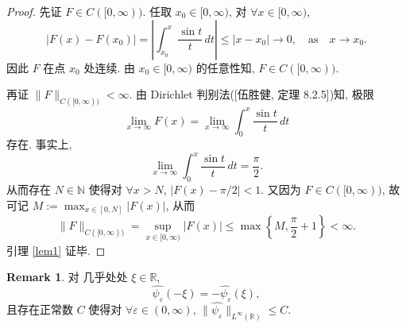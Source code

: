 \documentclass[a4paper,11pt]{article}
\theoremstyle{definition}
\newtheorem{remark}[theorem]{Remark}
\begin{document}
\begin{CJK*}{UTF8}{gbsn}
\begin{proof} 
    先证 $ F \in C([0, \infty)) $. 任取 $ x_0 \in [0, \infty) $,
    对 $ \forall x \in [0, \infty) $,
    $$
        |F(x) - F(x_0)|
            = \left| \int_{x_0}^x \frac{\sin t}{t} \, dt \right|
            \leq |x - x_0|
            \to 0, \quad \text{as} \quad x \to x_0.
    $$
    因此 $ F $ 在点 $ x_0 $ 处连续. 由 $ x_0 \in [0, \infty) $ 的任意性知, $ F \in C([0, \infty)) $.

    再证 $ \| F \|_{C([0, \infty))} < \infty $.
    由 Dirichlet 判别法([伍胜健, 定理 8.2.5])知, 极限
    $$
        \lim_{x \to \infty} F(x) 
            = \lim_{x \to \infty} \int_0^x \frac{\sin t}{t} \, dt
    $$
    存在. 事实上,
    $$
        \lim_{x \to \infty} \int_0^x \frac{\sin t}{t} \, dt = \frac{\pi}{2}.
    $$ 
    从而存在 $ N \in \mathbb{N} $ 使得对 $ \forall x > N $, $ |F(x) - \pi/2| < 1 $.
    又因为 $ F \in C([0, \infty)) $, 故可记 $ M := \max_{x \in [0, N]} |F(x)| $, 
    从而
    $$
        \| F \|_{C([0, \infty))} = \sup_{x \in [0, \infty)} |F(x)| 
            \leq \max \left\{M, \frac{\pi}{2} + 1 \right\} < \infty.
    $$
    引理 \ref{lem1} 证毕.
\end{proof}

\begin{remark}  \label{remark3}
    对 几乎处处 $ \xi \in \mathbb{R} $, 
    $$ 
        \widehat{\psi_\varepsilon} (- \xi)
            = - \widehat{\psi_\varepsilon} (\xi),
    $$
    且存在正常数 $ C $ 使得对 $ \forall \varepsilon \in (0, \infty) $, 
    $ \| \widehat{\psi_\varepsilon} \|_{L^\infty(\mathbb{R})} \leq C $.
\end{remark}
 

\end{CJK*}
\end{document}

